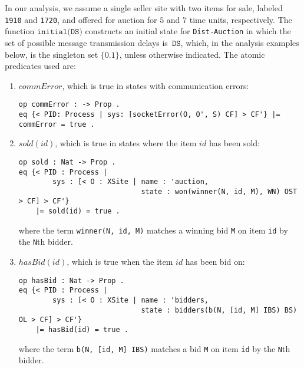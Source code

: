 \documentclass{eptcs}
\begin{document}
In our analysis, we assume a single seller site with two items for sale, labeled \texttt{1910} and \texttt{1720}, and offered for auction for $5$ and $7$ time units, respectively. The function $\texttt{initial(DS)}$ constructs an initial state for \texttt{Dist-Auction} in which the set of possible message transmission delays is~$\texttt{DS}$, which, in the analysis examples below, is the singleton set $\{ 0.1 \}$, unless otherwise indicated. The atomic predicates used are: 
\begin{enumerate}
\item $\mathit{commError}$, which is true in states with communication errors:

\begin{small}
\begin{verbatim}
op commError : -> Prop .
eq {< PID: Process | sys: [socketError(O, O', S) CF] > CF'} |= commError = true .
\end{verbatim}
\end{small}

\item $\mathit{sold}(id)$, which is true in states where the item $id$ has been sold: 

\begin{small}
\begin{verbatim}
op sold : Nat -> Prop .
eq {< PID : Process | 
        sys : [< O : XSite | name : 'auction, 
                             state : won(winner(N, id, M), WN) OST > CF] > CF'} 
    |= sold(id) = true .
\end{verbatim}
\end{small}

\noindent where the term \texttt{winner(N, id, M)} matches a winning bid \texttt{M} on item \texttt{id} by the \texttt{N}th bidder.

\item $\mathit{hasBid}(id)$, which is true when the item $id$ has been bid on:

\begin{small}
\begin{verbatim}
op hasBid : Nat -> Prop .
eq {< PID : Process | 
        sys : [< O : XSite | name : 'bidders, 
                             state : bidders(b(N, [id, M] IBS) BS) OL > CF] > CF'} 
    |= hasBid(id) = true .
\end{verbatim}
\end{small}

\noindent where the term \texttt{b(N, [id, M] IBS)} matches a bid \texttt{M} on item \texttt{id} by the \texttt{N}th bidder.


\end{enumerate}
\end{document}
